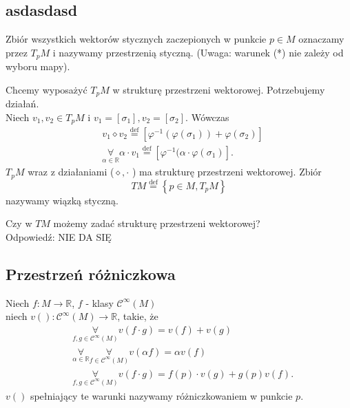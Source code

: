 \documentclass[../main.tex]{subfiles}
\begin{document}
    \subsection{asdasdasd}
    Zbiór wszystkich wektorów stycznych zaczepionych w punkcie $p\in M$ oznaczamy przez  $T_pM$ i nazywamy przestrzenią styczną. (Uwaga: warunek (*) nie zależy od wyboru mapy).

    Chcemy wyposażyć $T_pM$ w strukturę przestrzeni wektorowej. Potrzebujemy działań.\\
    Niech $v_1,v_2\in T_pM$ i $v_1 = [\sigma_1], v_2 = [\sigma_2]$. Wówczas\\

    \begin{align*}
         &v_1 \diamond v_2 \overset{\text{def}}{=} \left[ \varphi^{-1}(\varphi(\sigma_1))+\varphi(\sigma_2) \right]\\
         &\underset{\alpha\in\mathbb{R}}{\forall} \alpha\cdot v_1 \overset{\text{def}}{=} \left[ \varphi^{-1}(\alpha\cdot \varphi(\sigma_1) \right]
    .\end{align*}
    $T_pM$ wraz z działaniami ($\diamond, \cdot $ ) ma strukturę przestrzeni wektorowej. Zbiór
    \[
        TM \overset{\text{def}}{=} \left\{ p\in M, T_pM \right\}
    \]  nazywamy wiązką styczną.

    \begin{pytanie}
        Czy w $TM$ możemy zadać strukturę przestrzeni wektorowej?\\
        Odpowiedź: NIE DA SIĘ
    \end{pytanie}

    \subsection{Przestrzeń różniczkowa}
    Niech $f: M\to \mathbb{R}$, $f$ - klasy $\mathcal{C}^{\infty}(M)$ \\
    niech $v\left(  \right) : \mathcal{C}^{\infty}(M)\to\mathbb{R}$, takie, że
    \begin{align*}
    &\underset{f,g\in\mathcal{C}^{\infty}\left( M \right) }{\forall}v(f\cdot g) = v(f) + v(g)\\
    &\underset{\alpha\in\mathbb{R}}{\forall} \underset{f\in\mathcal{C}^\infty(M)}{\forall} v(\alpha f) = \alpha v(f)\\
    & \underset{f,g\in\mathcal{C}^\infty (M)}{\forall} v(f\cdot g) = f(p) \cdot v(g) + g(p)v(f)
    .\end{align*}
    $v\left(  \right) $ spełniający te warunki nazywamy różniczkowaniem w punkcie $p$.
\end{document}
